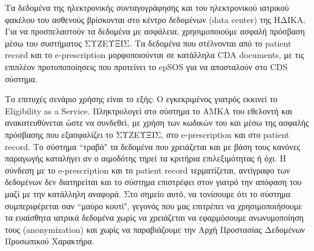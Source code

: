 		
		
		Τα δεδομένα της ηλεκτρονικής συνταγογράφησης και του ηλεκτρονικού ιατρικού φακέλου του ασθενούς βρίσκονται στο κέντρο δεδομένων (data center) της ΗΔΙΚΑ. Για να προσπελαστούν τα δεδομένα με ασφάλεια, χρησιμοποιούμε ασφαλή πρόσβαση μέσω του συστήματος ΣΥΖΕΥΞΙΣ. Τα δεδομένα που στέλνονται από το patient record και το e-prescription μορφοποιούνται σε κατάλληλα CDA documents, με τις επιπλέον προτυποποίησεις που προτείνει το epSOS για να αποσταλούν στο CDS σύστημα.
		
		Το επιτυχές σενάριο χρήσης είναι το εξής: Ο εγκεκριμένος γιατρός εκκινεί το Eligibility as a Service. Πληκτρολογεί στο σύστημα το ΑΜΚΑ του εθελοντή και ανακατευθύνεται ώστε να συνδεθεί, με χρήση των κωδικών του και μέσω της ασφαλής πρόσβασης που εξασφαλίζει το ΣΥΖΕΥΞΙΣ, στο e-prescription και στο patient record. Το σύστημα ``τραβά" τα δεδομένα που χρειάζεται και με βάση τους κανόνες παραγωγής καταλήγει αν ο αιμοδότης τηρεί τα κριτήρια επιλεξιμότητας ή όχι. Η σύνδεση με το e-prescription και το patient record τερματίζεται, αντίγραφο των δεδομένων δεν διατηρείται και το σύστημα επιστρέφει στον γιατρό την απόφαση του μαζί με την κατάλληλη αναφορά. Στο σημείο αυτό, να τονίσουμε ότι το σύστημα συμπεριφέρεται σαν ``μαύρο κουτί", γεγονός που μας επιτρέπει να χρησιμοποιήσουμε τα ευαίσθητα ιατρικά δεδομένα χωρίς να χρειάζεται να εφαρμόσουμε ανωνυμοποίηση τους (anonymization) και χωρίς να παραβιάζουμε την Αρχή Προστασίας Δεδομένων Προσωπικού Χαρακτήρα. 
		
		
		
		
		
		
		
		
		
		
		
		
		